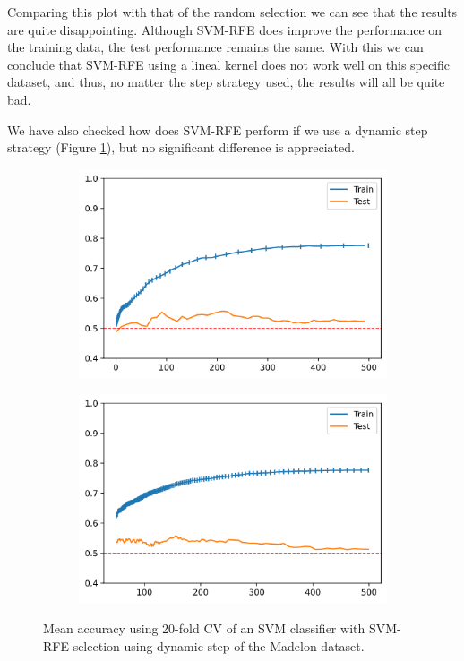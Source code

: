 Comparing this plot with that of the random selection we can see that the results are quite disappointing. Although SVM-RFE does improve the performance on the training data, the test performance remains the same. With this we can conclude that SVM-RFE using a lineal kernel does not work well on this specific dataset, and thus, no matter the step strategy used, the results will all be quite bad. 

We have also checked how does SVM-RFE perform if we use a dynamic step strategy (Figure \ref{fig:dynamicStep.madelon.dstep}), but no significant difference is appreciated.

\begin{figure}[H]
    \centering
    \begin{subfigure}[b]{0.4\linewidth}
        \includegraphics[width=\linewidth]{img/madelon-svmrfe-dstep-p_01.png}
    \end{subfigure}
    \begin{subfigure}[b]{0.4\linewidth}
        \includegraphics[width=\linewidth]{img/madelon-svmrfe-dstep-p_003.png}
    \end{subfigure}
    \caption{Mean accuracy using 20-fold CV of an SVM classifier with SVM-RFE selection using dynamic step of the Madelon dataset.}
    \label{fig:dynamicStep.madelon.dstep}
\end{figure}


